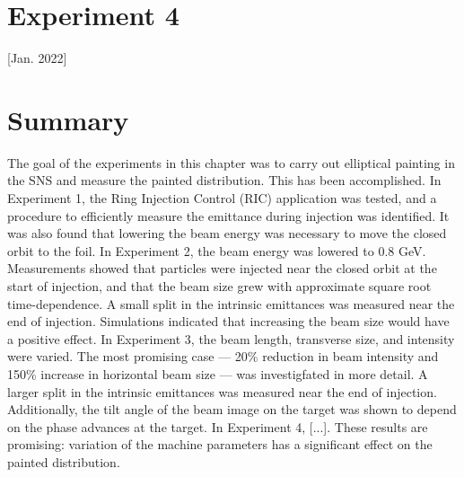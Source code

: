 \section{Experiment 4}

[Jan. 2022]


\section{Summary}

The goal of the experiments in this chapter was to carry out elliptical painting in the SNS and measure the painted distribution. This has been accomplished. In Experiment 1, the Ring Injection Control (RIC) application was tested, and a procedure to efficiently measure the emittance during injection was identified. It was also found that lowering the beam energy was necessary to move the closed orbit to the foil. In Experiment 2, the beam energy was lowered to 0.8 GeV. Measurements showed that particles were injected near the closed orbit at the start of injection, and that the beam size grew with approximate square root time-dependence. A small split in the intrinsic emittances was measured near the end of injection. Simulations indicated that increasing the beam size would have a positive effect. In Experiment 3, the beam length, transverse size, and intensity were varied. The most promising case — 20\% reduction in beam intensity and 150\% increase in horizontal beam size — was investigfated in more detail. A larger split in the intrinsic emittances was measured near the end of injection. Additionally, the tilt angle of the beam image on the target was shown to depend on the phase advances at the target. In Experiment 4, [...]. These results are promising: variation of the machine parameters has a significant effect on the painted distribution.